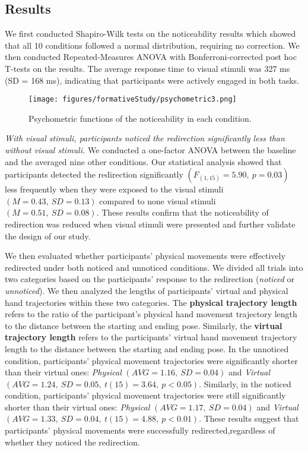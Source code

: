 \subsection{Results}
\label{section:study1results}

We first conducted Shapiro-Wilk tests on the noticeability results which showed that all 10 conditions followed a normal distribution, requiring no correction.
We then conducted Repeated-Measures ANOVA with Bonferroni-corrected post hoc T-tests on the results.
The average response time to visual stimuli was 327 ms (SD = 168 ms), indicating that participants were actively engaged in both tasks.

\begin{figure*}
    \centering
    \texttt{[image: figures/formativeStudy/psychometric3.png]}
    \caption{Psychometric functions of the noticeability in each condition.}
    \label{fig:psychometric}
\end{figure*}

\textit{With visual stimuli, participants noticed the redirection significantly less than without visual stimuli.}
We conducted a one-factor ANOVA between the baseline and the averaged nine other conditions.
Our statistical analysis showed that participants detected the redirection significantly $(F_{(1,15)}=5.90,~p=0.03)$ less frequently when they were exposed to the visual stimuli $(M=0.43,~SD=0.13)$ compared to none visual stimuli $(M=0.51,~SD=0.08)$.
These results confirm that the noticeability of redirection was reduced when visual stimuli were presented and further validate the design of our study.


We then evaluated whether participants' physical movements were effectively redirected under both noticed and unnoticed conditions. 
We divided all trials into two categories based on the participants' response to the redirection (\textit{noticed} or \textit{unnoticed}).
We then analyzed the lengths of participants' virtual and physical hand trajectories within these two categories.
The \textbf{physical trajectory length} refers to the ratio of the participant's physical hand movement trajectory length to the distance between the starting and ending pose.
Similarly, the \textbf{virtual trajectory length} refers to the participants' virtual hand movement trajectory length to the distance between the starting and ending pose.
In the unnoticed condition, participants' physical movement trajectories were significantly shorter than their virtual ones: \textit{Physical} $(AVG = 1.16,~SD = 0.04)$ and \textit{Virtual} $(AVG = 1.24,~SD = 0.05,~t(15) = 3.64,~p < 0.05)$.
Similarly, in the noticed condition, participants' physical movement trajectories were still significantly shorter than their virtual ones: \textit{Physical} $(AVG = 1.17,~SD = 0.04)$ and \textit{Virtual} $(AVG = 1.33,~SD = 0.04,~t(15) = 4.88,~p < 0.01)$.
These results suggest that participants' physical movements were successfully redirected,regardless of whether they noticed the redirection.

